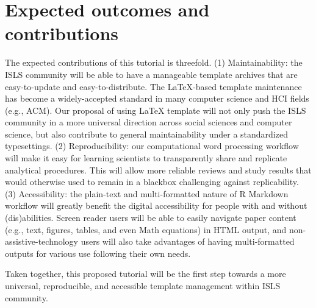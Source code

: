 \documentclass{article}
\begin{document}
\section{Expected outcomes and contributions}

The expected contributions of this tutorial is threefold. (1) Maintainability: the ISLS community will be able to have a manageable template archives that are easy-to-update and easy-to-distribute. The LaTeX-based template maintenance has become a widely-accepted standard in many computer science and HCI fields (e.g., ACM). Our proposal of using LaTeX template will not only push the ISLS community in a more universal direction across social sciences and computer science, but also contribute to general maintainability under a standardized typesettings. (2) Reproducibility: our computational word processing workflow will make it easy for learning scientists to transparently share and replicate analytical procedures. This will allow more reliable reviews and study results that would otherwise used to remain in a blackbox challenging against replicability. (3) Accessibility: the plain-text and multi-formatted nature of R Markdown workflow will greatly benefit the digital accessibility for people with and without (dis)abilities. Screen reader users will be able to easily navigate paper content (e.g., text, figures, tables, and even Math equations) in HTML output, and non-assistive-technology users will also take advantages of having multi-formatted outputs for various use following their own needs.

Taken together, this proposed tutorial will be the first step towards a more universal, reproducible, and accessible template management within ISLS community.

\end{document}
